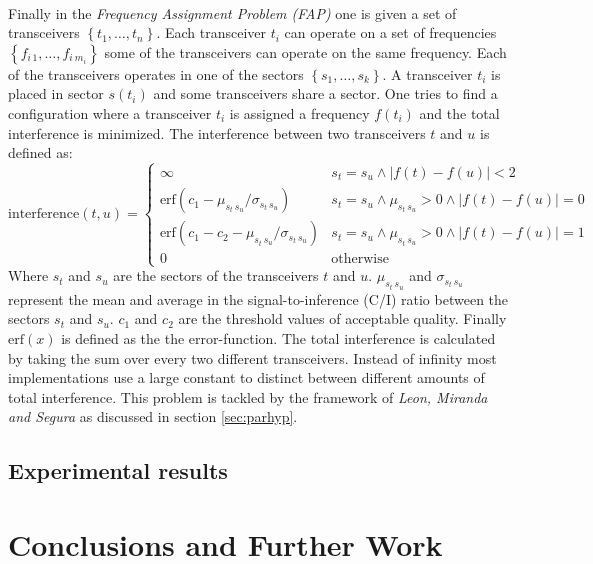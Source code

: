 \documentclass[a4paper,10pt]{article}
\newcommand{\secref}[1]{\ref{sec:#1}}
\newcommand{\abs}[1]{\ensuremath{\left| #1 \right|}}
\newcommand{\accl}[1]{\ensuremath{\left\{ #1 \right\}}}
\newcommand{\brak}[1]{\ensuremath{\left( #1 \right)}}
\newcommand{\fun}[2]{\ensuremath{#1\brak{#2}}}
\newcommand{\funm}[2]{\fun{\mbox{#1}}{#2}}
\newcommand{\guard}[1]{\ensuremath{\left\{\begin{array}{ll}#1\end{array}\right.}}
\theoremstyle{definition}
\begin{document}
\paragraph{}
Finally in the \emph{Frequency Assignment Problem (FAP)} one is given a set of transceivers $\accl{t_1,\ldots,t_n}$. Each transceiver $t_i$ can operate on a set of frequencies $\accl{f_{i\,1},\ldots,f_{i\ m_i}}$ some of the transceivers can operate on the same frequency. Each of the transceivers operates in one of the sectors $\accl{s_1,\ldots,s_k}$. A transceiver $t_i$ is placed in sector \fun{s}{t_i} and some transceivers share a sector. One tries to find a configuration where a transceiver $t_i$ is assigned a frequency $\fun{f}{t_i}$ and the total interference is minimized. The interference between two transceivers $t$ and $u$ is defined as:
\begin{equation}
\funm{interference}{t,u}=\guard{
\infty&s_t=s_u\wedge\abs{\fun{f}{t}-\fun{f}{u}}<2\\
\funm{erf}{c_1-\mu_{s_t\,s_u}/\sigma_{s_t\,s_u}}&s_t=s_u\wedge\mu_{s_t\,s_u}>0\wedge\abs{\fun{f}{t}-\fun{f}{u}}=0\\
\funm{erf}{c_1-c_2-\mu_{s_t\,s_u}/\sigma_{s_t\,s_u}}&s_t=s_u\wedge\mu_{s_t\,s_u}>0\wedge\abs{\fun{f}{t}-\fun{f}{u}}=1\\
0&\mbox{otherwise}
}
\end{equation}
Where $s_t$ and $s_u$ are the sectors of the transceivers $t$ and $u$. $\mu_{s_t\,s_u}$ and $\sigma_{s_t\,s_u}$ represent the mean and average in the signal-to-inference (C/I) ratio between the sectors $s_t$ and $s_u$. $c_1$ and $c_2$ are the threshold values of acceptable quality. Finally $\funm{erf}{x}$ is defined as the the error-function. The total interference is calculated by taking the sum over every two different transceivers. Instead of infinity most implementations use a large constant to distinct between different amounts of total interference. This problem is tackled by the framework of \emph{Leon, Miranda and Segura} as discussed in section \secref{parhyp}.

\subsection{Experimental results}


\section{Conclusions and Further Work}



\end{document}
